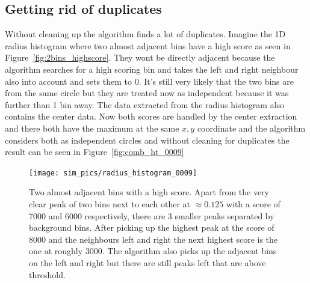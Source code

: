 \documentclass[11pt,twoside]{scrreprt}
\begin{document}
\subsection{Getting rid of duplicates} %
\label{ssub:getting_rid_of_duplicates}


Without cleaning up the algorithm finds a lot of duplicates. Imagine the 1D radius histogram where two almost adjacent bins have a high score as 
seen in Figure~\ref{fig:2bins_highscore}. They wont be directly adjacent because the algorithm searches for a high scoring bin and takes
the left and right neighbour also into account and sets them to 0.
It's still very likely that the two bins are from the same circle but they are treated now as independent because it was further than 1 bin 
away. The data extracted from the radius histogram also contains the center data. Now both scores are handled by the center extraction and
there both have the maximum at the same $x,y$ coordinate and the algorithm considers both as independent circles and without cleaning for duplicates
the result can be seen in Figure~\ref{fig:comb_ht_0009}

\begin{figure}[htb]
  \centering
  \texttt{[image: sim\_pics/radius\_histogram\_0009]}
  \caption[Histogram of duplicates]{Two almost adjacent bins with a high score\label{fig:2bins_highscore}. Apart from the very clear peak of two bins next to each
  other at $\approx 0.125$ with a score of 7000 and 6000 respectively, there are 3 smaller peaks separated by background bins. After picking
  up the highest peak at the score of 8000 and the neighbours left and right the next highest score is the one at roughly 3000. The algorithm
  also picks up the adjacent bins on the left and right but there are still peaks left that are above threshold.}
  \label{fig:bin_peak}
\end{figure}
\end{document}
